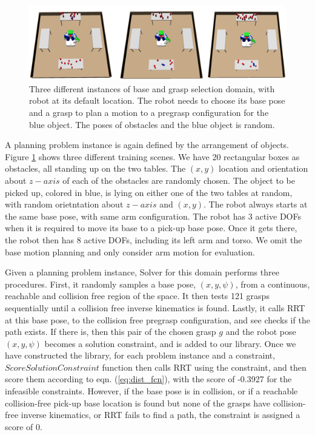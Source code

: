 \begin{figure}[htb]
\centering
\includegraphics[scale=0.5]{./figures/choosing_base_loc_and_grasp}
\caption{Three different instances of base and grasp selection domain, with
robot at its default location. The robot needs to choose its base pose
and a grasp to plan a motion to a pregrasp configuration for the blue object. 
The poses of obstacles and the blue object is random.
}
\label{fig:gb_domain}
\end{figure}

A planning problem instance is again defined by the arrangement of objects.
Figure \ref{fig:gb_domain} shows three different training scenes.
We have 20 rectangular boxes as obstacles, all standing up on the two tables.
The $(x,y)$ location and orientation about $z-axis$ of each of the obstacles 
are randomly chosen.
The object to be picked up, colored in blue, is lying on either one of the
two tables at random, with random orietntation about $z-axis$ and $(x,y)$. 
The robot always starts at the same base pose, with same arm configuration.
The robot has 3 active DOFs when it is required to move its base to a
pick-up base pose. Once it gets there,
the robot then has 8 active DOFs, including its left arm and torso. We omit
the base motion planning and only consider arm motion for evaluation.

Given a planning problem instance, Solver for this domain performs 
three procedures. First, it randomly samples a base pose, $(x,y,\psi)$,  
from a continuous, reachable and collision free region of the space. It then
tests 121 grasps sequentially until a collision free inverse 
kinematics is found. Lastly, it calls RRT at this base pose, to the
collision free pregrasp configuration, and see checks if the path exists.
If there is, then  this pair of the chosen grasp $g$ and 
the robot pose $(x,y,\psi)$ becomes a solution constraint, and is added to our library.
Once we have constructed the library, for each problem instance and a constraint,
$ScoreSolutionConstraint$ function then calls RRT
using the constraint, and then score them according to eqn. (\ref{eq:dist_fcn}), with the
score of -0.3927 for the infeasible constraints.
However, if the base pose is in collision, or if a reachable collision-free pick-up 
base location is found but none of the grasps have collision-free inverse kinematics, 
or RRT fails to find a path, the constraint is assigned a score of 0. 

